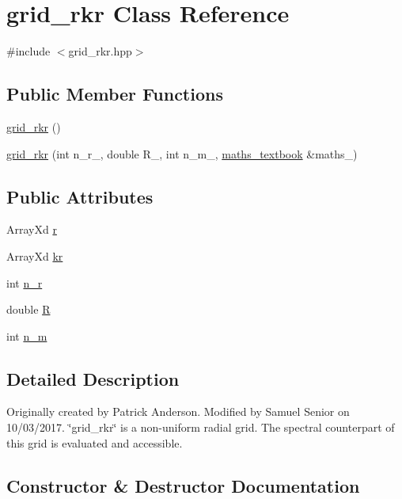 \hypertarget{classgrid__rkr}{}\section{grid\+\_\+rkr Class Reference}
\label{classgrid__rkr}


{\ttfamily \#include $<$grid\+\_\+rkr.\+hpp$>$}

\subsection*{Public Member Functions}
\begin{DoxyCompactItemize}
\item 
\hyperlink{classgrid__rkr_a8c3f61553704783780b89fb19aeb400c}{grid\+\_\+rkr} ()
\item 
\hyperlink{classgrid__rkr_adc3dbfbeb1dcc1ac948b58d26a83ffd1}{grid\+\_\+rkr} (int n\+\_\+r\+\_\+, double R\+\_\+, int n\+\_\+m\+\_\+, \hyperlink{classmaths__textbook}{maths\+\_\+textbook} \&maths\+\_\+)
\end{DoxyCompactItemize}
\subsection*{Public Attributes}
\begin{DoxyCompactItemize}
\item 
Array\+Xd \hyperlink{classgrid__rkr_a0c68f261e53153368d0edab4c9a8ef88}{r}
\item 
Array\+Xd \hyperlink{classgrid__rkr_aa09a97ce2aa9975fb4d2c1ee5da98b26}{kr}
\item 
int \hyperlink{classgrid__rkr_a332c5e88e5c3a08e67b11254173d9530}{n\+\_\+r}
\item 
double \hyperlink{classgrid__rkr_a2da8ae00c520a66c9cac2784a2149dcb}{R}
\item 
int \hyperlink{classgrid__rkr_ae580ce329d0cc89097775a6f4297b2ea}{n\+\_\+m}
\end{DoxyCompactItemize}


\subsection{Detailed Description}
Originally created by Patrick Anderson. Modified by Samuel Senior on 10/03/2017. \char`\"{}grid\+\_\+rkr\char`\"{} is a non-\/uniform radial grid. The spectral counterpart of this grid is evaluated and accessible. 

\subsection{Constructor \& Destructor Documentation}
\mbox{\label{classgrid__rkr_a8c3f61553704783780b89fb19aeb400c}} 
